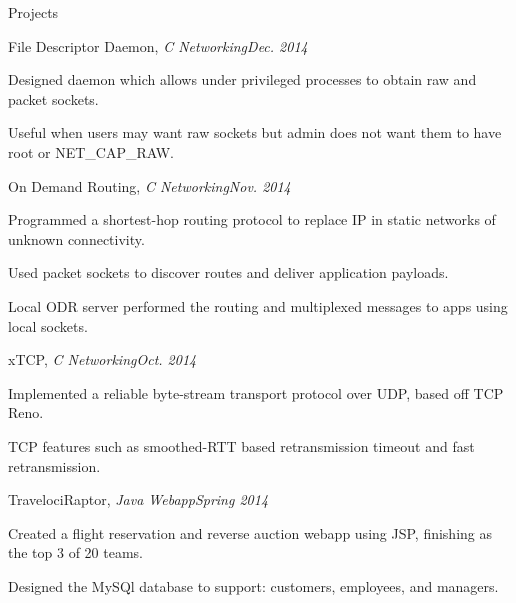 \documentclass{resume} %
\begin{document}
\begin{rSection}{Projects}

\begin{rSubsection}{File Descriptor Daemon, {\em C Networking}}{{\em Dec. 2014}}{}{}
\item Designed daemon which allows under privileged processes to obtain raw and packet sockets.
\item Useful when users may want raw sockets but admin does not want them to have root or NET\_CAP\_RAW.
\end{rSubsection}

\begin{rSubsection}{On Demand Routing, {\em C Networking}}{{\em Nov. 2014}}{}{}
\item Programmed a shortest-hop routing protocol to replace IP in static networks of unknown connectivity.
\item Used packet sockets to discover routes and deliver application payloads.
\item Local ODR server performed the routing and multiplexed messages to apps using local sockets.
\end{rSubsection}

\begin{rSubsection}{xTCP, {\em C Networking}}{{\em Oct. 2014}}{}{}
\item Implemented a reliable byte-stream transport protocol over UDP, based off TCP Reno.
\item TCP features such as smoothed-RTT based retransmission timeout and fast retransmission.
\end{rSubsection}

\begin{rSubsection}{TravelociRaptor, {\em Java Webapp}}{{\em Spring 2014}}{}{}
\item Created a flight reservation and reverse auction webapp using JSP, finishing as the top 3 of 20 teams.
\item Designed the MySQl database to support: customers, employees, and managers.
\end{rSubsection}


\end{rSection}
\end{document}

